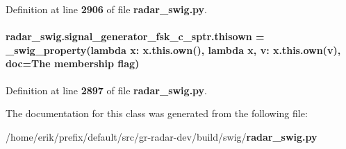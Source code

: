 Definition at line {\bf 2906} of file {\bf radar\+\_\+swig.\+py}.

\paragraph[{thisown}]{\setlength{\rightskip}{0pt plus 5cm}radar\+\_\+swig.\+signal\+\_\+generator\+\_\+fsk\+\_\+c\+\_\+sptr.\+thisown = {\bf \+\_\+swig\+\_\+property}(lambda x\+: x.\+this.\+own(), lambda {\bf x}, v\+: x.\+this.\+own(v), doc=\textquotesingle{}The membership flag\textquotesingle{})\hspace{0.3cm}{\ttfamily [static]}}\label{classradar__swig_1_1signal__generator__fsk__c__sptr_a9c46eeb05ee10dc5502fa8a64bee3f6f}


Definition at line {\bf 2897} of file {\bf radar\+\_\+swig.\+py}.



The documentation for this class was generated from the following file\+:\begin{DoxyCompactItemize}
\item 
/home/erik/prefix/default/src/gr-\/radar-\/dev/build/swig/{\bf radar\+\_\+swig.\+py}\end{DoxyCompactItemize}
